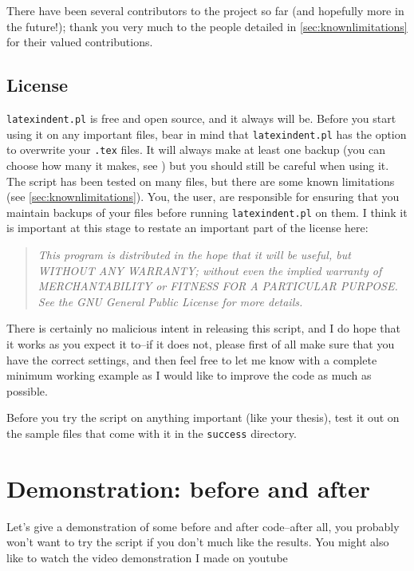 \documentclass[11pt]{article}
\begin{document}
There have been several contributors to the project so far (and hopefully more in 
the future!); thank you very much to the people detailed in \vref{sec:knownlimitations}
for their valued contributions.

\subsection{License}
\lstinline!latexindent.pl! is free and open source, and it always will be.
Before you start using it on any important files, bear in mind that \lstinline!latexindent.pl! has the option to overwrite your \lstinline!.tex! files.
It will always make at least one backup (you can choose how many it makes, see )
but you should still be careful when using it. The script has been tested on many
files, but there are some known limitations (see \cref{sec:knownlimitations}).
You, the user, are responsible for ensuring that you maintain backups of your files
before running \lstinline!latexindent.pl! on them. I think it is important at this
stage to restate an important part of the license here:
\begin{quote}\itshape
	This program is distributed in the hope that it will be useful,
	but WITHOUT ANY WARRANTY; without even the implied warranty of
	MERCHANTABILITY or FITNESS FOR A PARTICULAR PURPOSE.  See the
	GNU General Public License for more details.
\end{quote}
There is certainly no malicious intent in releasing this script, and I do hope
that it works as you expect it to--if it does not, please first of all
make sure that you have the correct settings, and then feel free to let me know with a
complete minimum working example as I would like to improve the code as much as possible.

\begin{warning}
	Before you try the script on anything important (like your thesis), test it
	out on the sample files that come with it in the \lstinline!success! directory.
\end{warning}


\section{Demonstration: before and after}
Let's give a demonstration of some before and after code--after all, you probably
won't want to try the script if you don't much like the results. You might also
like to watch the video demonstration I made on youtube \cite{cmh:videodemo}
\end{document}
